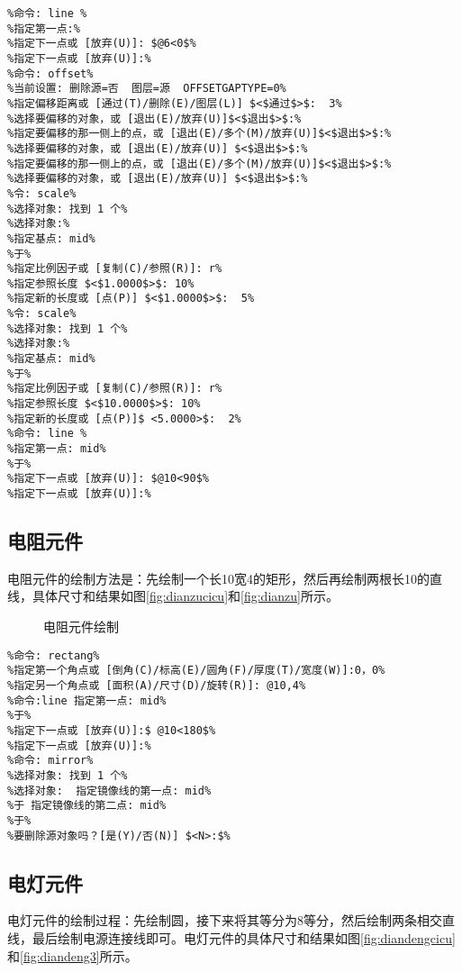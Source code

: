 \begin{lstlisting}
%命令: line %
%指定第一点:%
%指定下一点或 [放弃(U)]: $@6<0$%
%指定下一点或 [放弃(U)]:%
%命令: offset%
%当前设置: 删除源=否  图层=源  OFFSETGAPTYPE=0%
%指定偏移距离或 [通过(T)/删除(E)/图层(L)] $<$通过$>$:  3%
%选择要偏移的对象，或 [退出(E)/放弃(U)]$<$退出$>$:%
%指定要偏移的那一侧上的点，或 [退出(E)/多个(M)/放弃(U)]$<$退出$>$:%
%选择要偏移的对象，或 [退出(E)/放弃(U)] $<$退出$>$:%
%指定要偏移的那一侧上的点，或 [退出(E)/多个(M)/放弃(U)]$<$退出$>$:%
%选择要偏移的对象，或 [退出(E)/放弃(U)] $<$退出$>$:%
%令: scale%
%选择对象: 找到 1 个%
%选择对象:%
%指定基点: mid%
%于%
%指定比例因子或 [复制(C)/参照(R)]: r%
%指定参照长度 $<$1.0000$>$: 10%
%指定新的长度或 [点(P)] $<$1.0000$>$:  5%
%令: scale%
%选择对象: 找到 1 个%
%选择对象:%
%指定基点: mid%
%于%
%指定比例因子或 [复制(C)/参照(R)]: r%
%指定参照长度 $<$10.0000$>$: 10%
%指定新的长度或 [点(P)]$ <5.0000>$:  2%
%命令: line %
%指定第一点: mid%
%于%
%指定下一点或 [放弃(U)]: $@10<90$%
%指定下一点或 [放弃(U)]:%
\end{lstlisting}
\subsection{电阻元件}
电阻元件的绘制方法是：先绘制一个长10宽4的矩形，然后再绘制两根长10的直线，具体尺寸和结果如图\ref{fig:dianzucicu}和\ref{fig:dianzu}所示。

\noindent
\begin{figure}[htbp]
\centering
{}\hspace{30pt}
\caption{电阻元件绘制}
\end{figure}

\begin{lstlisting}
%命令: rectang%
%指定第一个角点或 [倒角(C)/标高(E)/圆角(F)/厚度(T)/宽度(W)]:0，0%
%指定另一个角点或 [面积(A)/尺寸(D)/旋转(R)]: @10,4%
%命令:line 指定第一点: mid%
%于%
%指定下一点或 [放弃(U)]:$ @10<180$%
%指定下一点或 [放弃(U)]:%
%命令: mirror%
%选择对象: 找到 1 个%
%选择对象:  指定镜像线的第一点: mid%
%于 指定镜像线的第二点: mid%
%于%
%要删除源对象吗？[是(Y)/否(N)] $<N>:$%
\end{lstlisting}
\subsection{电灯元件}
电灯元件的绘制过程：先绘制圆，接下来将其等分为8等分，然后绘制两条相交直线，最后绘制电源连接线即可。电灯元件的具体尺寸和结果如图\ref{fig:diandengcicu}和\ref{fig:diandeng3}所示。

